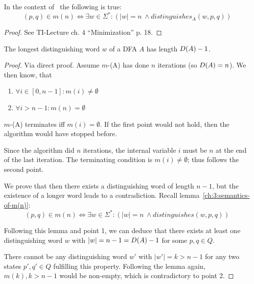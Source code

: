 \begin{lemma}\label{ch:3:semantics-of-m(n)}
    In the context of \CompDist\ the following is true:
    \[
        (p,q) \in m(n) \Longleftrightarrow \exists w\in\Sigma^*\colon (|w| = n\ \land distinguishes_A(w, p, q))
    \]
\end{lemma}

\begin{proof}
	See TI-Lecture ch. 4 ``Minimization'' p. 18.
\end{proof}

\begin{lemma}\label{ch:3:semantics-of-D(A)}
    The longest distinguishing word $w$ of a DFA $A$ has length $D(A)-1$.
\end{lemma}

\begin{proof}
	Via direct proof. Assume $m$-\CompDist(A) has done $n$ iterations (so $D(A) = n$). We then know, that
	\begin{enumerate}
		\item $\forall i \in [0,n-1]\colon m(i) \neq \emptyset$
		\item $\forall i > n-1\colon m(n)= \emptyset$ 
	\end{enumerate}
	$m$-\CompDist(A) terminates iff $m(i) = \emptyset$. If the first point would not hold, then the algorithm would have stopped before.
	
	Since the algorithm did $n$ iterations, the internal variable $i$ must be $n$ at the end of the last iteration. The terminating condition is $m(i) \neq \emptyset$; thus follows the second point.
    
    We prove that then there exists a distinguishing word of length $n-1$, but the existence of a longer word leads to a contradiction. Recall lemma~\ref{ch:3:semantics-of-m(n)}:
    \[
        (p,q) \in m(n) \Longleftrightarrow \exists w\in\Sigma^*\colon (|w| = n\ \land distinguishes(w, p, q))
    \]

	
	\noindent Following this lemma and point 1, we can deduce that there exists at least one distinguishing word $w$ with $|w| = n-1 = D(A)-1$ for some $p,q \in Q$.
	
	
	There cannot be any distinguishing word $w'$ with $|w'| = k > n-1$ for any two states $p',q'\in Q$ fulfilling this property. Following the lemma again, $m(k), k > n-1$ would be non-empty, which is contradictory to point 2.
\end{proof}

